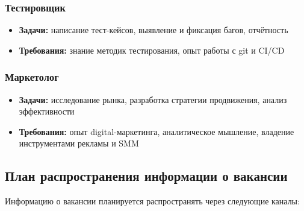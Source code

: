 \documentclass[14pt, russian]{matmex-diploma-custom}
\begin{document}
\subsubsection{Тестировщик}
\begin{itemize}
  \item \textbf{Задачи:} написание тест-кейсов, выявление и фиксация багов, отчётность
  \item \textbf{Требования:} знание методик тестирования, опыт работы с git и CI/CD
\end{itemize}

\subsubsection{Маркетолог}
\begin{itemize}
  \item \textbf{Задачи:} исследование рынка, разработка стратегии продвижения, анализ эффективности
  \item \textbf{Требования:} опыт digital-маркетинга, аналитическое мышление, владение инструментами рекламы и SMM
\end{itemize}

\subsection{План распространения информации о вакансии}
Информацию о вакансии планируется распространять через следующие каналы:
\end{document}
